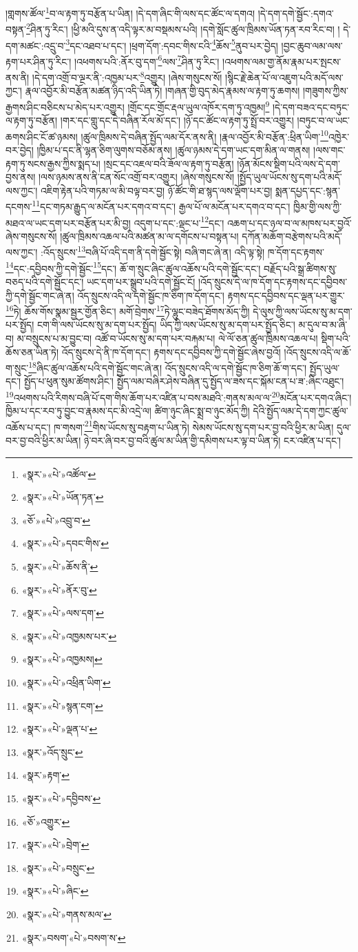 །གླགས་ཚོལ་\footnote{«སྣར་»«པེ་»འཚོལ་}བ་ལ་རྟག་ཏུ་བརྩོན་པ་ཡིན། །དེ་དག་ཞིང་གི་ལས་དང་ཚོང་ལ་དགའ། །དེ་དག་དགེ་སྦྱོང་:དགའ་བསྟན་\footnote{«སྣར་»«པེ་»ཡོན་ཏན་}ཤིན་ཏུ་རིང་། །ཕྱི་མའི་དུས་ན་འདི་ལྟར་མ་བསྡམས་པའི། །དགེ་སློང་ཚུལ་ཁྲིམས་ཡོན་ཏན་རབ་རིང་བ། །
དེ་དག་མཚང་:འདྲུ་བ་\footnote{«ཅོ་»«པེ་»འབྲུ་བ་}དང་འཐབ་པ་དང་། །ཕྲག་དོག་:དབང་གིས་ངའི་\footnote{«སྣར་»«པེ་»དབང་གིས་}ཆོས་\footnote{«སྣར་»«པེ་»ཆོས་ནི་}ནུབ་པར་བྱེད། །བྱང་ཆུབ་ལམ་ལས་རྟག་པར་ཤིན་ཏུ་རིང་། །འཕགས་པའི་:ནོར་བུ་དག་\footnote{«སྣར་»«པེ་»ནོར་བུ་}ལས་\footnote{«སྣར་»«པེ་»ལས་དག་}ཤིན་ཏུ་རིང་། །འཕགས་ལམ་གྱ་ནོམ་རྣམ་པར་སྤངས་ནས་ནི། །དེ་དག་འགྲོ་བ་ལྔར་ནི་:འཁྱམ་པར་\footnote{«སྣར་»«པེ་»འཁྱམས་པར་}འགྱུར། །ཞེས་གསུངས་སོ། །སྙིང་རྗེ་ཆེན་པོ་ལ་འཇུག་པའི་མདོ་ལས་ཀྱང་། རྣལ་འབྱོར་མི་བརྩོན་མཚན་ཉིད་འདི་ཡིན་ཏེ། །གཞན་གྱི་བུད་མེད་རྣམས་ལ་རྟག་ཏུ་ཆགས། །གཟུགས་ཀྱིས་རྒྱགས་ཤིང་བཅིངས་པ་མེད་པར་འགྱུར། །གྲོང་དང་གྲོང་རྡལ་ཡུལ་འཁོར་དག་ཏུ་འཁྱམ།\footnote{«སྣར་»«པེ་»འཁྱམས།} །དེ་དག་བཟའ་དང་བཏུང་ལ་རྟག་ཏུ་བརྩོན། །གར་དང་གླུ་དང་དེ་བཞིན་རོལ་མོ་དང་། །ཉོ་དང་ཚོང་ལ་རྟག་ཏུ་སྤྲོ་བར་འགྱུར། །བཏུང་བ་ལ་ཡང་ཆགས་ཤིང་ངོ་ཚ་ཉམས། །ཚུལ་ཁྲིམས་དེ་བཞིན་སྤྱོད་ལམ་དོར་ནས་ནི། །རྣལ་འབྱོར་མི་བརྩོན་:ཕྲིན་ཡིག་\footnote{«སྣར་»«པེ་»འཕྲིན་ཡིག་}འཁྱེར་བར་བྱེད། །ཁྱིམ་པ་དང་ནི་ལྷན་ཅིག་ལུགས་བཅོམ་ནས། །ཚུལ་ཉམས་དེ་དག་ཡང་དག་མིན་ལ་གནས། །ལས་གང་རྟག་ཏུ་སངས་རྒྱས་ཀྱིས་སྨད་པ། །སྲང་དང་འཇལ་བའི་ཟོལ་ལ་རྟག་ཏུ་བརྩོན། །ཉོན་མོངས་སྡིག་པའི་ལས་དེ་དག་བྱས་ནས། །ལས་ཉམས་ནས་ནི་ངན་སོང་འགྲོ་བར་འགྱུར། །ཞེས་གསུངས་སོ། །སྤྱོད་ཡུལ་ཡོངས་སུ་དག་པའི་མདོ་ལས་ཀྱང་། འཇིག་རྟེན་པའི་གཏམ་ལ་མི་བལྟ་བར་བྱ། ཉོ་ཚོང་གི་ཐ་སྙད་ལས་ལྡོག་པར་བྱ། སྨན་དཔྱད་དང་:སྙན་དངགས་\footnote{«སྣར་»«པེ་»སྙན་ངག་}དང་གཏམ་རྒྱུད་ལ་མངོན་པར་དགའ་བ་དང་། རྒྱལ་པོ་ལ་མངོན་པར་དགའ་བ་དང་། ཁྱིམ་གྱི་ལས་ཀྱི་མཐའ་ལ་ཡང་དག་པར་བརྩོན་པར་མི་བྱ། འདུག་པ་དང་:ལྡང་པ་\footnote{«སྣར་»«པེ་»ལྡན་པ་}དང་། འཆག་པ་དང་ཉལ་བ་ལ་མཁས་པར་བྱའོ་ཞེས་གསུངས་སོ། །ཚུལ་ཁྲིམས་འཆལ་པའི་མཚན་མ་ལ་དགོངས་པ་བསྟན་པ། དཀོན་མཆོག་བརྩེགས་པའི་མདོ་ལས་ཀྱང་། :འོད་སྲུངས་\footnote{«སྣར་»འོད་སྲུང་}བཞི་པོ་འདི་དག་ནི་དགེ་སྦྱོང་སྟེ། བཞི་གང་ཞེ་ན། འདི་ལྟ་སྟེ། ཁ་དོག་དང་རྟགས་\footnote{«སྣར་»རྟག་}དང་:དབྱིབས་ཀྱི་དགེ་སྦྱོང་\footnote{«སྣར་»«པེ་»དབྱིབས་}དང་། ཆོ་ག་སྲུང་ཞིང་ཚུལ་འཆོས་པའི་དགེ་སྦྱོང་དང་། བརྗོད་པའི་སྒྲ་ཚིགས་སུ་བཅད་པའི་དགེ་སྦྱོང་དང་། ཡང་དག་པར་སྒྲུབ་པའི་དགེ་སྦྱོང་ངོ། །འོད་སྲུངས་དེ་ལ་ཁ་དོག་དང་རྟགས་དང་དབྱིབས་ཀྱི་དགེ་སྦྱོང་གང་ཞེ་ན། འོད་སྲུངས་འདི་ལ་དགེ་སྦྱོང་ཁ་ཅིག་ཁ་དོག་དང་། རྟགས་དང་དབྱིབས་དང་ལྡན་པར་གྱུར་\footnote{«ཅོ་»འགྱུར་}ཏེ། ཆོས་གོས་སྣམ་སྦྱར་གྱོན་ཅིང་། མགོ་བྲེགས་\footnote{«སྣར་»«པེ་»བྲེག་}ཏེ་ལྷུང་བཟེད་ཐོགས་མོད་ཀྱི། དེ་ལུས་ཀྱི་ལས་ཡོངས་སུ་མ་དག་པར་སྤྱོད། ངག་གི་ལས་ཡོངས་སུ་མ་དག་པར་སྤྱོད། ཡིད་ཀྱི་ལས་ཡོངས་སུ་མ་དག་པར་སྤྱོད་ཅིང་། མ་དུལ་བ་མ་ཞི་བ། མ་བསྲུངས་པ་མ་བྱུང་བ། འཚོ་བ་ཡོངས་སུ་མ་དག་པར་བརྐམ་པ། ལེ་ལོ་ཅན་ཚུལ་ཁྲིམས་འཆལ་པ། སྡིག་པའི་ཆོས་ཅན་ཡིན་ཏེ། འོད་སྲུངས་དེ་ནི་ཁ་དོག་དང་། རྟགས་དང་དབྱིབས་ཀྱི་དགེ་སྦྱོང་ཞེས་བྱའོ། །འོད་སྲུངས་འདི་ལ་ཆོ་ག་སྲུང་\footnote{«སྣར་»«པེ་»བསྲུང་}ཞིང་ཚུལ་འཆོས་པའི་དགེ་སྦྱོང་གང་ཞེ་ན། འོད་སྲུངས་འདི་ལ་དགེ་སྦྱོང་ཁ་ཅིག་ཆོ་ག་དང་། སྤྱོད་ཡུལ་དང་། སྤྱོད་པ་ཕུན་སུམ་ཚོགས་ཤིང་། སྤྱོད་ལམ་བཞིར་ཤེས་བཞིན་དུ་སྤྱོད་ལ་ཟས་དང་སྐོམ་ངན་པ་ཟ་:ཞིང་འཐུང་། \footnote{«སྣར་»«པེ་»ཞིང་}འཕགས་པའི་རིགས་བཞི་པོ་དག་གིས་ཆོག་པར་འཛིན་པ་བས་མཐའི་:གནས་མལ་ལ་\footnote{«སྣར་»«པེ་»གནས་མལ་}མངོན་པར་དགའ་ཞིང་། ཁྱིམ་པ་དང་རབ་ཏུ་བྱུང་བ་རྣམས་དང་མི་འདྲེ་ལ། ཚིག་ཉུང་ཞིང་སྨྲ་བ་ཉུང་མོད་ཀྱི། དེའི་སྤྱོད་ལམ་དེ་དག་ཀྱང་ཚུལ་འཆོས་པ་དང་། ཁ་གསག་\footnote{«སྣར་»བསག་«པེ་»བསག་ས་}གིས་ཡོངས་སུ་བརྟག་པ་ཡིན་ཏེ། སེམས་ཡོངས་སུ་དག་པར་བྱ་བའི་ཕྱིར་མ་ཡིན། དུལ་བར་བྱ་བའི་ཕྱིར་མ་ཡིན། ཉེ་བར་ཞི་བར་བྱ་བའི་ཚུལ་མ་ཡིན་གྱི་དམིགས་པར་ལྟ་བ་ཡིན་ཏེ། ངར་འཛིན་པ་དང་། 